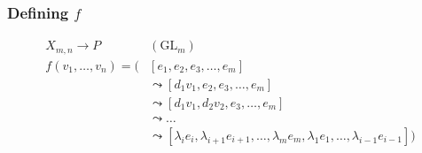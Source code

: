 \documentclass{beamer} %
\newcommand{\GLB}[1]{\GL_{#1}/B_{#1}}
\newcommand{\GL}{\mathrm{GL}}
\DeclareMathOperator{\Id}{Id}
\renewcommand{\l}{\lambda}
\begin{document}
\begin{frame}
  \frametitle{Defining $f$}

  \begin{align*}
    X_{m,n} \to P&(\GL_m) \\
    f(v_1,\dots,v_n) = \bigg(&\left[e_1,e_2,e_3,\dots,e_m \right] \\
    &\leadsto \left[d_1 v_1,e_2,e_3,\dots,e_m\right] \\
    &\leadsto \left[
      d_1 v_1,d_2 v_2,e_3,\dots,e_m\right] \\
    &\leadsto \dots \\
    &\leadsto \left[\l_i e_i, \l_{i+1}e_{i+1},\dots, \l_me_m,
      \l_1e_1, \dots, \l_{i-1}e_{i-1} \right]\bigg)
  \end{align*}

\end{frame}


\end{document}

